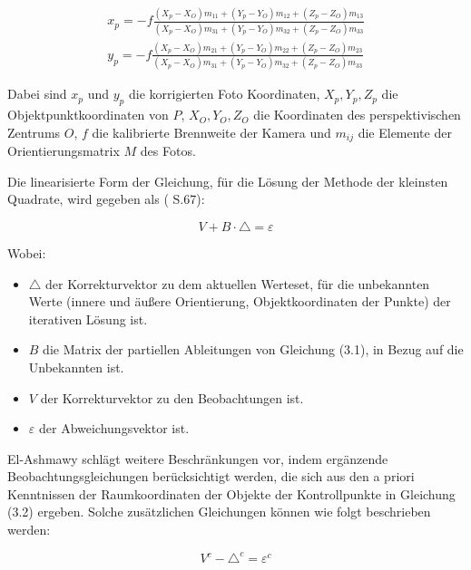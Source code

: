 \begin{equation}
\begin{aligned}
  x_p = -f \frac{(X_p-X_O)m_{11}+(Y_p-Y_O)m_{12}+(Z_p-Z_O)m_{13}}{(X_p-X_O)m_{31}+(Y_p-Y_O)m_{32}+(Z_p-Z_O)m_{33}} \\
    y_p = -f \frac{(X_p-X_O)m_{21}+(Y_p-Y_O)m_{22}+(Z_p-Z_O)m_{23}}{(X_p-X_O)m_{31}+(Y_p-Y_O)m_{32}+(Z_p-Z_O)m_{33}}
\end{aligned}
\end{equation}

Dabei sind $x_p$ und $y_p$ die korrigierten Foto Koordinaten, $X_p,Y_p,Z_p$ die Objektpunktkoordinaten von $P$, $X_O,Y_O,Z_O$ die Koordinaten des perspektivischen Zentrums $O$, $f$ die kalibrierte Brennweite der Kamera und $m_{ij}$ die Elemente der Orientierungsmatrix $M$ des Fotos.

Die linearisierte Form der Gleichung, für die Lösung der Methode der kleinsten Quadrate, wird gegeben als (\cite{comparative_conditions_study} S.67):

\begin{equation}
V+B\cdot\triangle =\varepsilon
\end{equation}

Wobei:
\begin{itemize}
\item $\triangle$ der Korrekturvektor zu dem aktuellen Werteset, für die unbekannten Werte (innere und äußere Orientierung, Objektkoordinaten der Punkte) der iterativen Lösung ist.

\item $B$ die Matrix der partiellen Ableitungen von Gleichung (3.1), in Bezug auf die Unbekannten  ist.

\item $V$ der Korrekturvektor zu den Beobachtungen ist.

\item $\varepsilon$ der Abweichungsvektor ist.
\end{itemize}

El-Ashmawy \cite{comparative_conditions_study} schlägt weitere Beschränkungen vor, indem ergänzende Beobachtungsgleichungen berücksichtigt werden, die sich aus den a priori Kenntnissen der Raumkoordinaten der Objekte der Kontrollpunkte in Gleichung (3.2) ergeben. Solche zusätzlichen Gleichungen können wie folgt beschrieben werden:

\begin{equation}
V^c-\triangle^c = \varepsilon^c
\end{equation}

